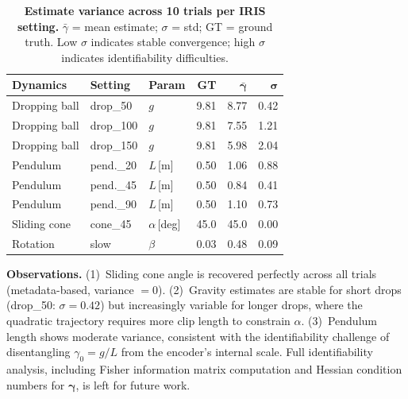 \documentclass[runningheads]{llncs}
\begin{document}
\begin{table}[H]
  \centering
  \caption{\textbf{Estimate variance across 10 trials per IRIS setting.}
  $\bar{\gamma}$ = mean estimate; $\sigma$ = std; GT = ground truth.
  Low $\sigma$ indicates stable convergence; high $\sigma$ indicates
  identifiability difficulties.}
  \label{tab:id_variance}
  \footnotesize
  \setlength{\tabcolsep}{5pt}
  \renewcommand{\arraystretch}{1.15}
  \begin{tabular}{@{}lllrrr@{}}
    \toprule
    \textbf{Dynamics} & \textbf{Setting} & \textbf{Param}
      & \textbf{GT} & $\bm{\bar{\gamma}}$ & $\bm{\sigma}$ \\
    \midrule
    Dropping ball & drop\_50  & $g$ & 9.81 & 8.77 & 0.42 \\
    Dropping ball & drop\_100 & $g$ & 9.81 & 7.55 & 1.21 \\
    Dropping ball & drop\_150 & $g$ & 9.81 & 5.98 & 2.04 \\
    Pendulum      & pend.\_20 & $L$\,[m] & 0.50 & 1.06 & 0.88 \\
    Pendulum      & pend.\_45 & $L$\,[m] & 0.50 & 0.84 & 0.41 \\
    Pendulum      & pend.\_90 & $L$\,[m] & 0.50 & 1.10 & 0.73 \\
    Sliding cone  & cone\_45  & $\alpha$\,[deg] & 45.0 & 45.0 & 0.00 \\
    Rotation      & slow      & $\beta$ & 0.03 & 0.48 & 0.09 \\
    \bottomrule
  \end{tabular}
\end{table}

\textbf{Observations.}  (1)~Sliding cone angle is recovered perfectly
across all trials (metadata-based, variance $= 0$).  (2)~Gravity estimates
are stable for short drops (drop\_50: $\sigma = 0.42$) but increasingly
variable for longer drops, where the quadratic trajectory requires more
clip length to constrain $\alpha$.  (3)~Pendulum length shows moderate
variance, consistent with the identifiability challenge of disentangling
$\gamma_0 = g/L$ from the encoder's internal scale.  Full identifiability
analysis, including Fisher information matrix computation and Hessian
condition numbers for $\boldsymbol{\gamma}$, is left for future work.


{\sloppy\printbibliography}
\end{document}
